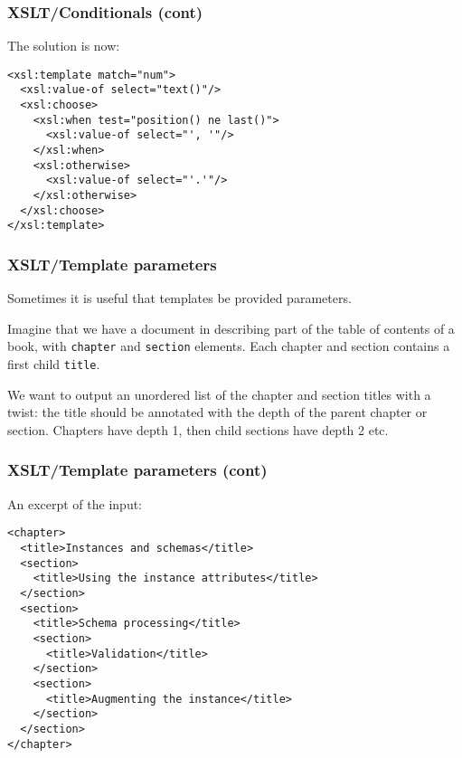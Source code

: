 %
\begin{frame}[containsverbatim]
\frametitle{XSLT/Conditionals (cont)}

The solution is now:
{\small
\begin{verbatim}
<xsl:template match="num">
  <xsl:value-of select="text()"/>
  <xsl:choose>
    <xsl:when test="position() ne last()">
      <xsl:value-of select="', '"/>
    </xsl:when>
    <xsl:otherwise>
      <xsl:value-of select="'.'"/>
    </xsl:otherwise>
  </xsl:choose>
</xsl:template>
\end{verbatim}
}

\end{frame}

%
\begin{frame}
\frametitle{XSLT/Template parameters}

Sometimes it is useful that templates be provided parameters.

\bigskip

Imagine that we have a document in \XML describing part of the table
of contents of a book, with \texttt{chapter} and \texttt{section}
elements. Each chapter and section contains a first child
\texttt{title}.

\bigskip

We want to output an unordered \XHTML list of the chapter and section
titles with a twist: the title should be annotated with the depth of
the parent chapter or section. Chapters have depth 1, then child
sections have depth 2 etc.

\end{frame}

%
\begin{frame}[containsverbatim]
\frametitle{XSLT/Template parameters (cont)}

An excerpt of the input:
{\small
\begin{verbatim}
<chapter>
  <title>Instances and schemas</title>
  <section>
    <title>Using the instance attributes</title>
  </section>
  <section>
    <title>Schema processing</title>
    <section>
      <title>Validation</title>
    </section>
    <section>
      <title>Augmenting the instance</title>
    </section>
  </section>
</chapter>
\end{verbatim}
}

\end{frame}

